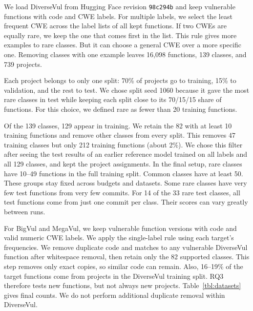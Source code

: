 \documentclass[conference]{IEEEtran}
\begin{document}
We load DiverseVul from Hugging Face revision \texttt{98c294b} and keep
vulnerable functions with code and CWE labels. For multiple labels, we
select the least frequent CWE across the label lists of all kept
functions. If two CWEs are equally rare, we keep the one that comes
first in the list. This rule gives more examples to rare classes. But it
can choose a general CWE over a more specific one. Removing classes with
one example leaves 16,098 functions, 139 classes, and 739 projects.

Each project belongs to only one split: 70\% of projects go to training,
15\% to validation, and the rest to test. We chose split seed 1060
because it gave the most rare classes in test while keeping each split
close to its 70/15/15 share of functions. For this choice, we defined
rare as fewer than 20 training functions.

Of the 139 classes, 129 appear in training. We retain the 82 with at
least 10 training functions and remove other classes from every split.
This removes 47 training classes but only 212 training functions (about
2\%). We chose this filter after seeing the test results of an earlier
reference model trained on all labels and all 129 classes, and kept the
project assignments. In the final setup, rare classes have 10--49
functions in the full training split. Common classes have at least 50.
These groups stay fixed across budgets and datasets. Some rare classes
have very few test functions from very few commits. For 14 of the 33
rare test classes, all test functions come from just one commit per
class. Their scores can vary greatly between runs.

For BigVul and MegaVul, we keep vulnerable function versions with code
and valid numeric CWE labels. We apply the single-label rule using each
target's frequencies. We remove duplicate code and matches to any
vulnerable DiverseVul function after whitespace removal, then retain
only the 82 supported classes. This step removes only exact copies, so
similar code can remain. Also, 16--19\% of the target functions come
from projects in the DiverseVul training split. RQ3 therefore tests new
functions, but not always new projects. Table~\ref{tbl:datasets} gives
final counts. We do not perform additional duplicate removal within
DiverseVul.
\end{document}
